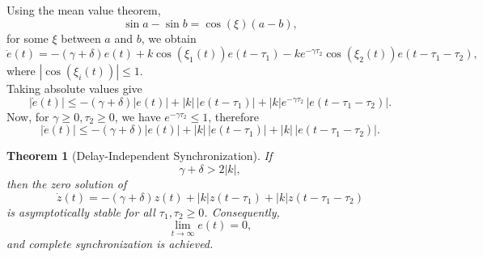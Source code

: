 \documentclass[11pt]{article}
\newtheorem{theorem}{Theorem}[section]
\theoremstyle{remark}
\begin{document}
Using the mean value theorem,
\[
\sin a - \sin b = \cos(\xi)(a-b),
\]
for some $\xi$ between $a$ and $b$, we obtain
\begin{equation}
	\dot e(t)
	= -(\gamma+\delta)e(t)
	+ k \cos(\xi_1(t)) e(t-\tau_1)
	- k e^{-\gamma\tau_2}\cos(\xi_2(t)) e(t-\tau_1-\tau_2),
	\label{eq:error_cos}
\end{equation}
where $|\cos(\xi_i(t))|\le 1$.\\

{
Taking absolute values give
\begin{equation}
	|\dot e(t)|
	\le -(\gamma+\delta)|e(t)|
	+ |k|\,|e(t-\tau_1)|+ |k| e^{-\gamma \tau_2}\,|e(t-\tau_1-\tau_2)|.
	\label{eq:bound_exact}
\end{equation}
Now, for $\gamma\ge0,\tau_2\ge0$, we have $e^{-\gamma\tau_2}\le1$, therefore
\begin{equation}
	|\dot e(t)|
	\le -(\gamma+\delta)|e(t)|
	+ |k|\,|e(t-\tau_1)|+ |k|\,|e(t-\tau_1-\tau_2)|.
	\label{eq:bound}
\end{equation}
}


\begin{theorem}[Delay-Independent Synchronization]
	\label{synch}
	If
	\begin{equation}
		\gamma+\delta > 2|k|,
		\label{eq:main_condition}
	\end{equation}
	then the zero solution of
	\begin{equation}
		\dot z(t)
		= -(\gamma+\delta)z(t)
		+ |k| z(t-\tau_1)
		+ |k| z(t-\tau_1-\tau_2)
		\label{eq:comparison}
	\end{equation}
	is asymptotically stable for all $\tau_1,\tau_2 \ge 0$. 
	Consequently,
	\[
	\lim_{t\to\infty} e(t)=0,
	\]
	and complete synchronization is achieved.
\end{theorem}
\end{document}
